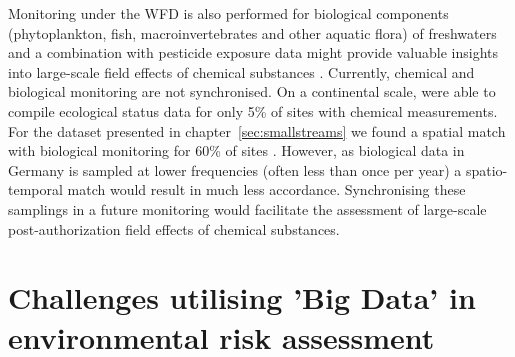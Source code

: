 Monitoring under the WFD is also performed for biological components (phytoplankton, fish, macroinvertebrates and other aquatic flora) of freshwaters \citep{european_union_directive_2000} and a combination with pesticide exposure data might provide valuable insights into large-scale field effects of chemical substances \citep{schipper_deriving_2014}.
Currently, chemical and biological monitoring are not synchronised.
On a continental scale, \citet{malaj_organic_2014} were able to compile ecological status data for only 5\% of sites with chemical measurements.
For the dataset presented in chapter~\ref{sec:smallstreams} we found a spatial match with biological monitoring for 60\% of sites \citep{brinke_umsetzung_2016}.
However, as biological data in Germany is sampled at lower frequencies (often less than once per year) a spatio-temporal match would result in much less accordance. 
Synchronising these samplings in a future monitoring would facilitate the assessment of large-scale post-authorization field effects of chemical substances. 



\section{Challenges utilising 'Big Data' in environmental risk assessment}

